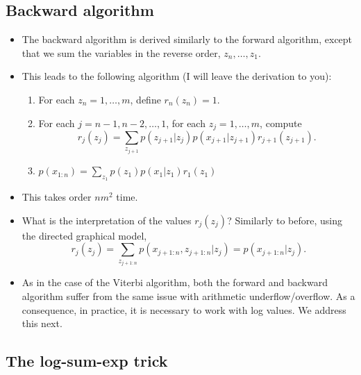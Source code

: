 \documentclass[12pt]{article}
\begin{document}
\subsection{Backward algorithm}
\begin{itemize}
\item The backward algorithm is derived similarly to the forward algorithm, except that we sum the variables in the reverse order, $z_n,\ldots,z_1$.
\item This leads to the following algorithm (I will leave the derivation to you):
\begin{enumerate}
\item For each $z_n = 1,\ldots,m$, define $r_n(z_n) = 1$.
\item For each $j = n -1,n -2,\ldots,1$, for each $z_j = 1,\ldots,m$, compute
$$ r_j(z_j) = \sum_{z_{j +1}} p(z_{j+1} | z_j) p(x_{j+1} | z_{j +1}) r_{j +1}(z_{j +1}). $$
\item $p(x_{1:n}) = \sum_{z_1} p(z_1)p(x_1 | z_1) r_1(z_1)$
\end{enumerate}
\item This takes order $n m^2$ time.
\item What is the interpretation of the values $r_j(z_j)$?  Similarly to before, using the directed graphical model,
$$ r_j(z_j) = \sum_{z_{j +1:n}} p(x_{j+1:n},z_{j+1:n} | z_j) = p(x_{j +1:n} | z_j). $$
\item As in the case of the Viterbi algorithm, both the forward and backward algorithm suffer from the same issue with arithmetic underflow/overflow.  As a consequence, in practice, it is necessary to work with log values. We address this next.
\end{itemize}


\subsection{The log-sum-exp trick}
\end{document}
